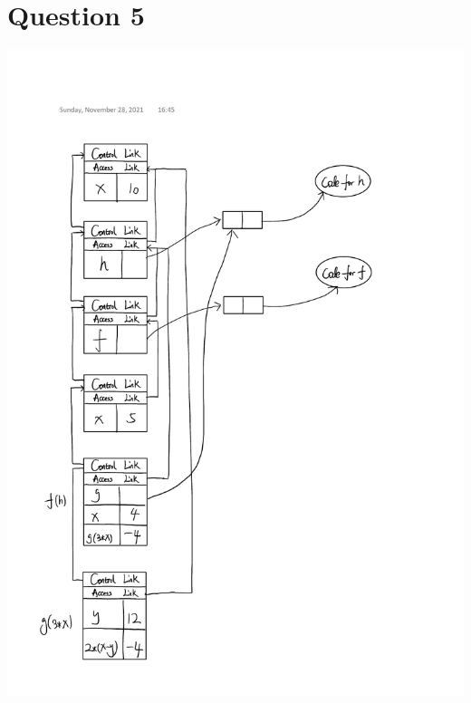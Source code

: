 \documentclass[12pt, a4paper]{article}
\begin{document}
	\section*{Question 5}
	\begin{center}
		\includegraphics[scale=0.9]{Q5.pdf}
	\end{center}
	
\end{document}
